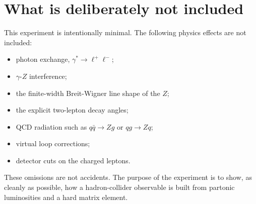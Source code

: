 \documentclass[11pt]{article}
\begin{document}
\section{What is deliberately not included}

This experiment is intentionally minimal.  The following physics effects are
not included:
\begin{itemize}
  \item photon exchange, \(\gamma^*\to\ell^+\ell^-\);
  \item \(\gamma\)-\(Z\) interference;
  \item the finite-width Breit-Wigner line shape of the \(Z\);
  \item the explicit two-lepton decay angles;
  \item QCD radiation such as \(q\bar q\to Zg\) or \(qg\to Zq\);
  \item virtual loop corrections;
  \item detector cuts on the charged leptons.
\end{itemize}
These omissions are not accidents.  The purpose of the experiment is to show,
as cleanly as possible, how a hadron-collider observable is built from
partonic luminosities and a hard matrix element.
\end{document}
